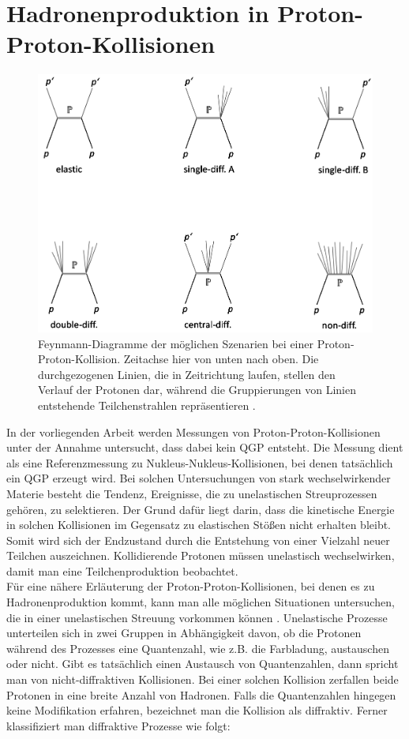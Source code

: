 \documentclass[12pt,a4paper]{report}
\begin{document}
\section{Hadronenproduktion in Proton-Proton-Kollisionen}
\label{sec:Hadrprok}
\begin{figure}[H]
\centering
\includegraphics[width=13cm]{DiffractiveProzesse.png} 
\caption{Feynmann-Diagramme der möglichen Szenarien bei einer Proton-Proton-Kollision. Zeitachse hier von unten nach oben. Die durchgezogenen Linien, die in Zeitrichtung laufen, stellen den Verlauf der Protonen dar, während die Gruppierungen von Linien entstehende Teilchenstrahlen repräsentieren \cite{luttig2017charged}.}
\label{Diffractiv}
\end{figure}
In der vorliegenden Arbeit werden Messungen von Proton-Proton-Kollisionen unter der Annahme untersucht, dass dabei kein QGP entsteht. Die Messung dient als eine Referenzmessung zu Nukleus-Nukleus-Kollisionen, bei denen tatsächlich ein QGP erzeugt wird. Bei solchen Untersuchungen von stark wechselwirkender Materie besteht die Tendenz, Ereignisse, die zu unelastischen Streuprozessen gehören, zu selektieren. Der Grund dafür liegt darin, dass die kinetische Energie in solchen Kollisionen im Gegensatz zu elastischen Stößen nicht erhalten bleibt. Somit wird sich der Endzustand durch die Entstehung von einer Vielzahl neuer Teilchen aus\-zeichnen. Kollidierende Protonen müssen unelastisch wechselwirken, damit man eine Teilchenproduktion beobachtet.\\
Für eine nähere Erläuterung der Proton-Proton-Kollisionen, bei denen es zu Hadronenproduktion kommt, kann man alle möglichen Situationen untersuchen, die in einer unelastischen Streuung vorkommen können \cite{luttigMA2010}. Unelastische Prozesse unterteilen sich in zwei Gruppen in Abhängigkeit davon, ob die Protonen während des Prozesses eine Quantenzahl, wie z.B. die Farbladung, austauschen oder nicht. Gibt es tatsächlich einen Austausch von Quantenzahlen, dann spricht man von nicht-diffraktiven Kollisionen. Bei einer solchen Kollision zerfallen beide Protonen in eine breite Anzahl von Hadronen. Falls die Quantenzahlen hingegen keine Modifikation erfahren, bezeichnet man die Kollision als diffraktiv. Ferner klassifiziert man diffraktive Prozesse wie folgt:
\end{document}

